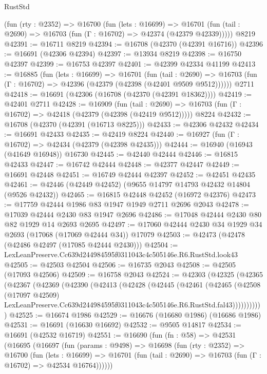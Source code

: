 \begin{lexlean}{RustStd}
\begin{coremodule}
    (fun (rty : @2352) =>
    @16700
      (fun (lets : @16699) =>
      @16701 (fun (tail : @2690) => @16703 (fun (Γ : @16702) => @42374 (@42379 @42339)))))
    @8219
@42391 := @16711 @8219
@42394 := @16708 (@42370 (@42391 @16716))
@42396 := @16691 (@42306 @42394)
@42397 := @13934 @8219
@42398 := @16750 @42397
@42399 := @16753 @42397
@42401 := @42399 @42334 @41199
@42413 := @16885
    (fun (lets : @16699) =>
    @16701
      (fun (tail : @2690) =>
      @16703 (fun (Γ : @16702) => @42396 (@42379 (@42398 (@42401 @9509 @9512))))))
    @2711
@42418 := @16691 (@42306 (@16708 (@42370 (@42391 @18362))))
@42419 := @42401 @2711
@42428 := @16909
    (fun (tail : @2690) => @16703 (fun (Γ : @16702) => @42418 (@42379 (@42398 (@42419 @9512)))))
    @8224
@42432 := @16708 (@42370 (@42391 (@16713 @8225)))
@42433 := @42306 @42432
@42434 := @16691 @42433
@42435 := @42419 @8224
@42440 := @16927 (fun (Γ : @16702) => @42434 (@42379 (@42398 @42435)))
@42444 := @16940 (@16943 (@41649 @16948)) @16730
@42445 := @42440 @42444
@42446 := @16815 @42433
@42447 := @16742 @42444
@42448 := @42377 @42447
@42449 := @16691 @42448
@42451 := @16749 @42444 @42397
@42452 := @42451 @42435
@42461 := @42446 (@42449 @42452) (@9655 @14797 @14793 @42432 @14804 (@9526 @42432))
@42465 := @16815 @42448 @42452 (@16972 @42376)
@42473 := @17759 @42444 @1986 @83 @1947 @1949 @2711 @2696 @2043
@42478 := @17039 @42444 @2430 @83 @1947 @2696
@42486 := @17048 @42444 @2430 @80 @82 @1929 @14 @2693 @2695
@42497 := @17060 @42444 @2430 @34 @1929 @34 @2693 (@17068 (@17069 @42444 @34)) @17079
@42503 := @42473 (@42478 (@42486 @42497 (@17085 @42444 @2430)))
@42504 := LexLeanPreserve.Cc639d244984595f0311043c4c505146e.R6.RustStd.look43
@42505 := @42503 @42504
@42506 := @16735 @2043
@42508 := @42505 (@17093 @42506)
@42509 := @16758 @2043
@42524 := @42303
    (@42325
      (@42365
        (@42367
          (@42369
            (@42390
              (@42413
                (@42428
                  (@42445
                    (@42461
                      (@42465
                        (@42508
                          (@17097 @42509)
                          LexLeanPreserve.Cc639d244984595f0311043c4c505146e.R6.RustStd.fal43)))))))))))
@42525 := @16674 @1986
@42529 := @16676 (@16680 @1986) (@16686 @1986)
@42531 := @16691 (@16630 @16692)
@42532 := @9505 @14817
@42534 := @16691 (@42532 @16719)
@42551 := @16690
    (fun (fn : @58) =>
    @42531
      (@16695
        (@16697
          (fun (params : @9498) =>
          @16698
            (fun (rty : @2352) =>
            @16700
              (fun (lets : @16699) =>
              @16701 (fun (tail : @2690) => @16703 (fun (Γ : @16702) => @42534 @16764))))))

\end{coremodule}
\end{lexlean}
